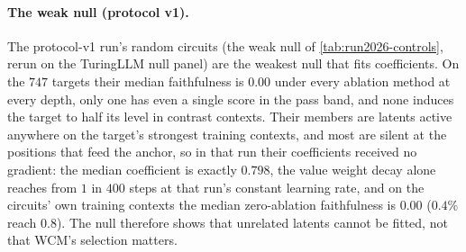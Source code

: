 \documentclass[10pt]{article}
\begin{document}
\paragraph{The weak null (protocol v1).}
The protocol-v1 run's random circuits (the weak null of \cref{tab:run2026-controls}, rerun on the TuringLLM null panel) are the weakest null that fits coefficients.
On the $747$ targets their median faithfulness is $0.00$ under every ablation method at every depth, only one has even a single score in the pass band, and none induces the target to half its level in contrast contexts.
Their members are latents active anywhere on the target's strongest training contexts, and most are silent at the positions that feed the anchor, so in that run their coefficients received no gradient: the median coefficient is exactly $0.798$, the value weight decay alone reaches from $1$ in $400$ steps at that run's constant learning rate, and on the circuits' own training contexts the median zero-ablation faithfulness is $0.00$ ($0.4\%$ reach $0.8$).
The null therefore shows that unrelated latents cannot be fitted, not that WCM's selection matters.
\end{document}
